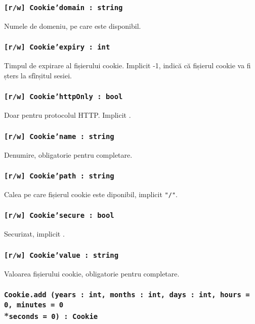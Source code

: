 \subsubsection{\texttt{[r/w] Cookie'domain : string}}

Numele de domeniu, pe care \cookie{} este disponibil.

\subsubsection{\texttt{[r/w] Cookie'expiry : int}}

Timpul de expirare al fișierului cookie. Implicit -1, indică că fișierul cookie va fi șters la sfîrșitul sesiei.

\subsubsection{\texttt{[r/w] Cookie'httpOnly : bool}}

Doar pentru protocolul HTTP. Implicit \false.

\subsubsection{\texttt{[r/w] Cookie'name : string}}

Denumire, obligatorie pentru completare.

\subsubsection{\texttt{[r/w] Cookie'path : string}}

Calea pe care fișierul cookie este diponibil, implicit \texttt{"/"}.

\subsubsection{\texttt{[r/w] Cookie'secure : bool}}

Securizat, implicit \false.

\subsubsection{\texttt{[r/w] Cookie'value : string}}

Valoarea fișierului cookie, obligatorie pentru completare.

\subsubsection{\texttt{Cookie.add (years : int, months : int, days : int, hours = 0, minutes = 0}\\*\noindent\texttt{seconds = 0) : Cookie}}

